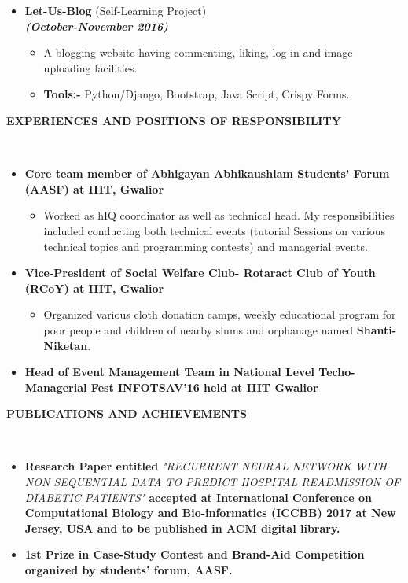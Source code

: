 \documentclass[a4paper,10pt]{article}
\newcommand{\isep}{-2 pt}
\newcommand{\lsep}{-0.5cm}
\newcommand{\resheading}[1]{{\small \colorbox{mygrey}{\begin{minipage}{0.975\textwidth}{\textbf{#1 \vphantom{p\^{E}}}}\end{minipage}}}}
\begin{document}
\begin{itemize}
\item \textbf{Let-Us-Blog
}  (Self-Learning Project)\\
 \emph \textbf{(October-November 2016)} \\[-0.6cm]
	\begin{itemize}\itemsep \isep
	\item A blogging website having commenting, liking, log-in and image uploading facilities. 
	\item\textbf {Tools:-} Python/Django, Bootstrap, Java Script, Crispy Forms.
	\end{itemize}
\end{itemize}

\resheading{\textbf{EXPERIENCES AND POSITIONS OF RESPONSIBILITY }}\\[\lsep]
\begin{itemize}
\item \textbf{Core team member of Abhigayan Abhikaushlam Students’ Forum (AASF) at IIIT, Gwalior }
\begin{itemize}\itemsep \isep
	\item Worked as hIQ coordinator as well as technical head. My responsibilities included conducting both technical events (tutorial Sessions on various technical topics and programming contests) and managerial events. 
	\end{itemize}
\end{itemize}

\begin{itemize}
\item \textbf{Vice-President of Social Welfare Club- Rotaract Club of Youth (RCoY) at IIIT, Gwalior }
\begin{itemize}\itemsep \isep
	\item Organized various cloth donation camps, weekly educational program for poor people and children of nearby slums and orphanage named \textbf{Shanti-Niketan}.
	\end{itemize}
\end{itemize}

\begin{itemize}
\item \textbf{Head of Event Management Team in National Level Techo-Managerial Fest INFOTSAV'16 held at IIIT Gwalior }
\end{itemize}


\resheading{\textbf{PUBLICATIONS AND ACHIEVEMENTS }}\\[\lsep]
\begin{itemize}
\item \textbf{Research Paper entitled} \textit{"RECURRENT NEURAL NETWORK WITH NON SEQUENTIAL DATA TO PREDICT HOSPITAL READMISSION OF DIABETIC PATIENTS"}\textbf{ accepted at International Conference on Computational Biology and Bio-informatics (ICCBB) 2017 at New Jersey, USA and to be published in ACM digital library.}
\end{itemize}
\begin{itemize}
\item \textbf{1st Prize in Case-Study Contest and Brand-Aid Competition organized by students' forum, AASF. }
\end{itemize}
\end{document}
